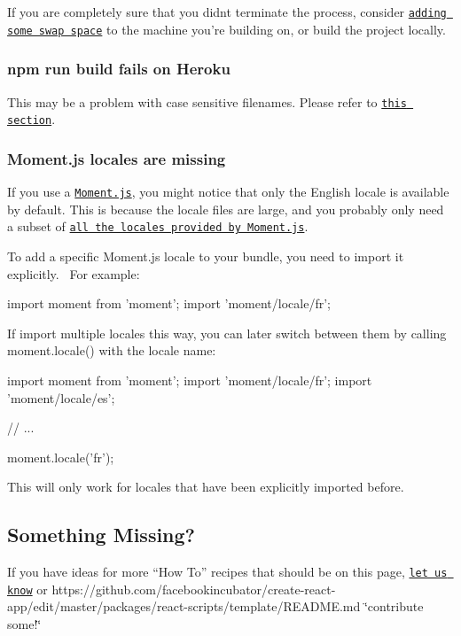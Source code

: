 If you are completely sure that you didn\textquotesingle{}t terminate the process, consider \href{https://www.digitalocean.com/community/tutorials/how-to-add-swap-on-ubuntu-14-04}{\tt adding some swap space} to the machine you’re building on, or build the project locally.

\subsubsection*{{\ttfamily npm run build} fails on Heroku}

This may be a problem with case sensitive filenames. Please refer to \href{#resolving-heroku-deployment-errors}{\tt this section}.

\subsubsection*{Moment.\+js locales are missing}

If you use a \href{https://momentjs.com/}{\tt Moment.\+js}, you might notice that only the English locale is available by default. This is because the locale files are large, and you probably only need a subset of \href{https://momentjs.com/#multiple-locale-support}{\tt all the locales provided by Moment.\+js}.

To add a specific Moment.\+js locale to your bundle, you need to import it explicitly.~\newline
 For example\+:


\begin{DoxyCode}
import moment from 'moment';
import 'moment/locale/fr';
\end{DoxyCode}


If import multiple locales this way, you can later switch between them by calling {\ttfamily moment.\+locale()} with the locale name\+:


\begin{DoxyCode}
import moment from 'moment';
import 'moment/locale/fr';
import 'moment/locale/es';

// ...

moment.locale('fr');
\end{DoxyCode}


This will only work for locales that have been explicitly imported before.

\subsection*{Something Missing?}

If you have ideas for more “\+How To” recipes that should be on this page, \href{https://github.com/facebookincubator/create-react-app/issues}{\tt let us know} or https\+://github.com/facebookincubator/create-\/react-\/app/edit/master/packages/react-\/scripts/template/\+R\+E\+A\+D\+M\+E.\+md \char`\"{}contribute some!\char`\"{} 